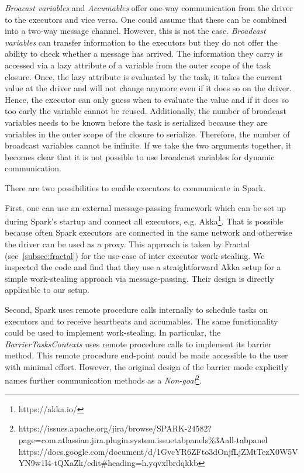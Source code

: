 \textit{Broacast variables} and \textit{Accumables} offer one-way communication from the driver to the executors and vice versa.
One could assume that these can be combined into a two-way message channel.
However, this is not the case.
\textit{Broadcast variables} can transfer information to the executors but they do not offer the ability to check whether a message has
arrived.
The information they carry is accessed via a lazy attribute of a variable from the outer scope of the task closure.
Once, the lazy attribute is evaluated by the task, it takes the current value at the driver and will not change anymore even if
it does so on the driver.
Hence, the executor can only guess when to evaluate the value and if it does so too early the variable cannot be reused.
Additionally, the number of broadcast variables needs to be known before the task is serialized because they are variables in the outer
scope of the closure to serialize.
Therefore, the number of broadcast variables cannot be infinite.
If we take the two arguments together, it becomes clear that it is not possible to use broadcast variables for dynamic communication.

There are two possibilities to enable executors to communicate in Spark.

First, one can use an external message-passing framework which can be set up during Spark's startup and connect all executors, e.g.
Akka\footnote{https://akka.io/}.
That is possible because often Spark executors are connected in the same network and otherwise the driver can be used as a proxy.
This approach is taken by Fractal (see~\cref{subsec:fractal}) for the use-case of inter executor work-stealing.
We inspected the code and find that they use a straightforward Akka setup for a simple work-stealing approach via message-passing.
Their design is directly applicable to our setup.

Second, Spark uses remote procedure calls internally to schedule tasks on executors and to receive heartbeats and accumables.
The same functionality could be used to implement work-stealing.
In particular, the \textit{BarrierTasksContexts} uses remote procedure calls to implement its barrier method.
This remote procedure end-point could be made accessible to the user with minimal effort.
However, the original design of the barrier mode explicitly names further communication methods as a \textit{Non-goal}\footnote{
https://issues.apache.org/jira/browse/SPARK-24582?page=com.atlassian.jira.plugin.system.issuetabpanels\%3Aall-tabpanel\\
https://docs.google.com/document/d/1GvcYR6ZFto3dOnjfLjZMtTezX0W5VYN9w1l4-tQXaZk/edit\#heading=h.yqvxlbrdqkkb}.

